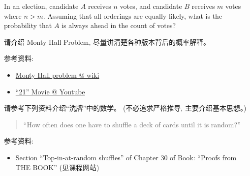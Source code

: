 \documentclass[a4paper, justified]{tufte-handout}
\begin{document}
\beginoptional

\begin{problem}
In an election, candidate $A$ receives $n$ votes,
and candidate $B$ receives $m$ votes where $n > m$.
Assuming that all orderings are equally likely,
what is the probability that $A$ is always ahead in the count of votes?
\end{problem}

\begin{solution}
\end{solution}

\beginot

\begin{ot}
  请介绍 Monty Hall Problem, 尽量讲清楚各种版本背后的概率解释。

  \noindent 参考资料:
  \begin{itemize}
    \item \href{https://en.wikipedia.org/wiki/Monty\_Hall\_problem}{Monty Hall problem @ wiki}
    \item \href{https://www.youtube.com/watch?v=cXqDIFUB7YU}{``21'' Movie @ Youtube}
  \end{itemize}
\end{ot}

\begin{ot}
  \noindent 请参考下列资料介绍``洗牌''中的数学。
  (不必追求严格推导, 主要介绍基本思想。)

  \begin{quote}
    ``How often does one have to shuffle a deck of cards until it is random?''
  \end{quote}

  \noindent 参考资料:
  \begin{itemize}
    \item Section ``Top-in-at-random shuffles'' of Chapter 30
          of Book: ``Proofs from THE BOOK'' (见课程网站)
  \end{itemize}
\end{ot}


\end{document}
